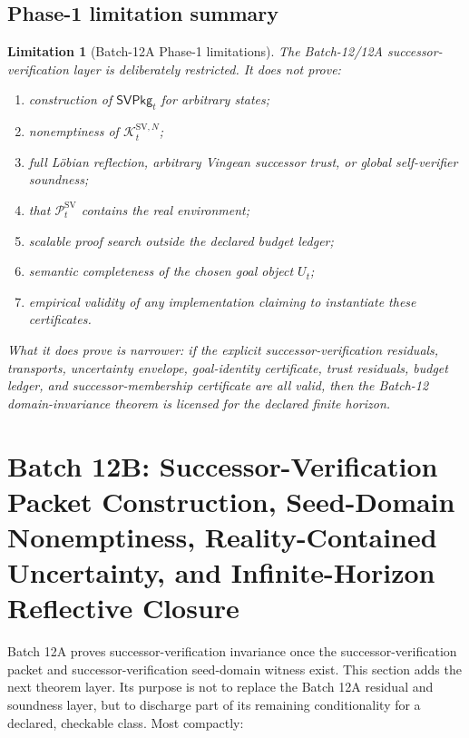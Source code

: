 \documentclass[11pt]{article}
\newtheorem{limitation}[theorem]{Limitation}
\newcommand{\Pcal}{\mathcal{P}}
\newcommand{\1}{\mathbf{1}}
\providecommand{\Kcal}{\mathcal{K}}
\begin{document}
\subsection{Phase-1 limitation summary}

\begin{limitation}[Batch-12A Phase-1 limitations]
\label{lim:batch12a_phase1_limitations}
The Batch-12/12A successor-verification layer is deliberately restricted.  It does not prove:
\begin{enumerate}[label=(\roman*),leftmargin=1.5em]
    \item construction of \(\mathsf{SVPkg}_t\) for arbitrary states;
    \item nonemptiness of \(\Kcal_t^{\mathrm{SV},N}\);
    \item full L\"obian reflection, arbitrary Vingean successor trust, or global self-verifier soundness;
    \item that \(\Pcal_t^{\mathrm{SV}}\) contains the real environment;
    \item scalable proof search outside the declared budget ledger;
    \item semantic completeness of the chosen goal object \(U_t\);
    \item empirical validity of any implementation claiming to instantiate these certificates.
\end{enumerate}
What it does prove is narrower: if the explicit successor-verification residuals, transports, uncertainty envelope, goal-identity certificate, trust residuals, budget ledger, and successor-membership certificate are all valid, then the Batch-12 domain-invariance theorem is licensed for the declared finite horizon.
\end{limitation}



\section{Batch 12B: Successor-Verification Packet Construction, Seed-Domain Nonemptiness, Reality-Contained Uncertainty, and Infinite-Horizon Reflective Closure}
\label{sec:batch12b_sv_packet_nonemptiness_infinite_closure}

Batch 12A proves successor-verification invariance once the successor-verification packet and successor-verification seed-domain witness exist.  This section adds the next theorem layer.  Its purpose is not to replace the Batch 12A residual and soundness layer, but to discharge part of its remaining conditionality for a declared, checkable class.  Most compactly:
\begin{center}
\end{center}
\end{document}
